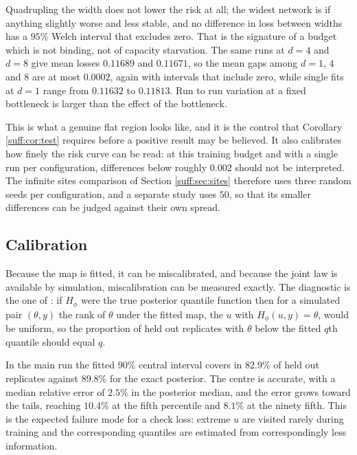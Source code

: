 Quadrupling the width does not lower the risk at all; the widest network is if anything
slightly worse and less stable, and no difference in loss between widths has a $95\%$ Welch interval
that excludes zero. That is the signature of a budget which is not binding, not of capacity
starvation. The same runs at $d=4$ and $d=8$ give mean losses $0.11689$ and $0.11671$, so the
mean gaps among $d=1$, $4$ and $8$ are at most $0.0002$, again with intervals that include
zero, while single fits at $d=1$ range from $0.11632$ to $0.11813$. Run to run variation at a
fixed bottleneck is larger than the effect of the bottleneck.

This is what a genuine flat region looks like, and it is the control that Corollary
\ref{suff:cor:test} requires before a positive result may be believed. It also calibrates how
finely the risk curve can be read: at this training budget and with a single run per
configuration, differences below roughly $0.002$ should not be interpreted. The infinite
sites comparison of Section \ref{suff:sec:sites} therefore uses three random seeds per
configuration, and a separate study uses $50$, so that its smaller differences can be judged against their own spread.

\subsection{Calibration}
\label{suff:sec:calib}

Because the map is fitted, it can be miscalibrated, and because the joint law is available by
simulation, miscalibration can be measured exactly. The diagnostic is the one of
\citet{suff:cook2006}: if $H_\phi$ were the true posterior quantile function then for a
simulated pair $(\theta,y)$ the rank of $\theta$ under the fitted map, the $u$ with $H_\phi(u,y)=\theta$, would be uniform, so the proportion of
held out replicates with $\theta$ below the fitted $q$th quantile should equal $q$.

In the main run the fitted $90\%$ central interval covers in $82.9\%$ of held out replicates
against $89.8\%$ for the exact posterior. The centre is accurate, with a median relative error
of $2.5\%$ in the posterior median, and the error grows toward the tails, reaching $10.4\%$ at
the fifth percentile and $8.1\%$ at the ninety fifth. This is the expected failure mode for a
check loss: extreme $u$ are visited rarely during training and the corresponding quantiles are
estimated from correspondingly less information.

